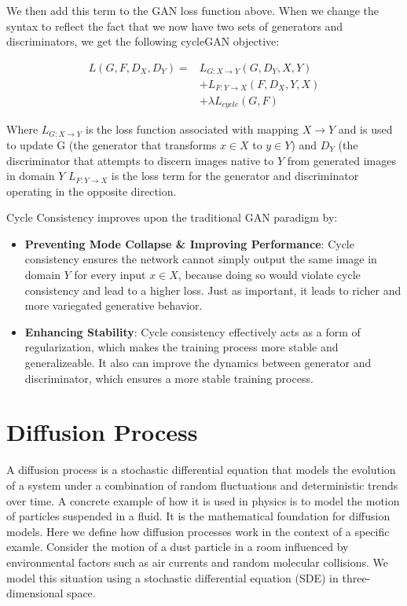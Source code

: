 \documentclass[12pt]{article}
\begin{document}
We then add this term to the GAN loss function above. When we change the syntax to reflect the fact that we now have two sets of generators and discriminators, we get the following cycleGAN objective:

\begin{align}
    L(G, F, D_X, D_Y) = &L_{G: X \rightarrow Y}(G, D_Y, X, Y) \nonumber \\
    &+ L_{F: Y \rightarrow X}(F, D_X, Y, X) \nonumber \\
    &+ \lambda L_{cycle}(G, F)
\end{align}

Where \(L_{G: X \rightarrow Y}\) is the loss function associated with mapping \(X \rightarrow Y \) and is used to update G (the generator that transforms \( x \in X\) to \(y \in Y\)) and \(D_Y\) (the discriminator that attempts to discern images native to \(Y\) from generated images in domain \(Y\) \(L_{F: Y \rightarrow X}\) is the loss term for the generator and discriminator operating in the opposite direction. 

Cycle Consistency improves upon the traditional GAN paradigm by: 
\begin{itemize}
\item\textbf{Preventing Mode Collapse \& Improving Performance}: Cycle consistency ensures the network cannot simply output the same image in domain \(Y\) for every input \(x \in X\), because doing so would violate cycle consistency and lead to a higher loss. Just as important, it leads to richer and more variegated generative behavior.
\item\textbf{Enhancing Stability}: Cycle consistency effectively acts as a form of regularization, which makes the training process more stable and generalizeable. It also can improve the dynamics between generator and discriminator, which ensures a more stable training process.
\end{itemize}
\section{Diffusion Process}
A diffusion process is a stochastic differential equation that models the evolution of a system under a combination of random fluctuations and deterministic trends over time. A concrete example of how it is used in physics is to model the motion of particles suspended in a fluid. It is the mathematical foundation for diffusion models. Here we define how diffusion processes work in the context of a specific examle. Consider the motion of a dust particle in a room influenced by environmental factors such as air currents and random molecular collisions. We model this situation using a stochastic differential equation (SDE) in three-dimensional space.
\end{document}
